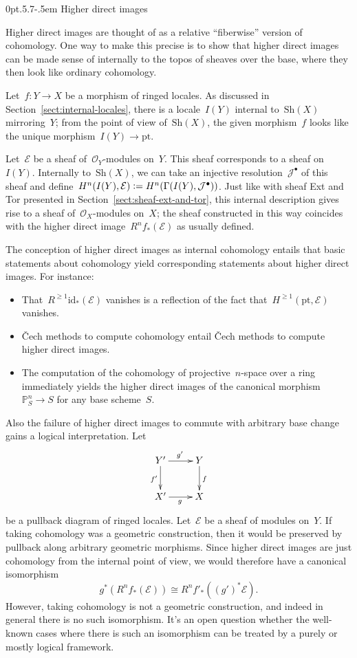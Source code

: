\documentclass[10pt,reqno,a4paper]{amsbook}
\makeatletter
\theoremstyle{definition}
\theoremstyle{plain}
\theoremstyle{remark}
\newcommand{\E}{\mathcal{E}}
\renewcommand{\O}{\mathcal{O}}
\newcommand{\J}{\mathcal{J}}
\newcommand{\PP}{\mathbb{P}}
\newcommand{\id}{\mathrm{id}}
\newcommand{\Sh}{\mathrm{Sh}}
\newcommand{\pt}{\mathrm{pt}}
\newcommand{\?}{\,{:}\,}
\renewcommand{\_}{\mathpunct{.}\,}
\newcommand{\defeq}{\vcentcolon=}
\def\subsection{\@startsection{subsection}{2}%
  {0pt}{.5\linespacing\@plus.7\linespacing}{-.5em}%
  {\normalfont\bfseries}}
\makeatother
\begin{document}
\subsection{Higher direct images}

Higher direct images are thought of as a relative ``fiberwise'' version of
cohomology. One way to make this precise is to show that higher direct images
can be made sense of internally to the topos of sheaves over the base, where
they then look like ordinary cohomology.

Let~$f : Y \to X$ be a morphism of ringed locales. As discussed in
Section~\ref{sect:internal-locales}, there is a locale~$I(Y)$ internal
to~$\Sh(X)$ mirroring~$Y$; from the point of view of~$\Sh(X)$, the given
morphism~$f$ looks like the unique morphism~$I(Y) \to \pt$.

Let~$\E$ be a sheaf of~$\O_Y$-modules on~$Y$. This sheaf corresponds to a sheaf
on~$I(Y)$. Internally to~$\Sh(X)$, we can take an injective
resolution~$\J^\bullet$ of this sheaf and define~$H^n(I(Y), \E) \defeq
H^n(\Gamma(I(Y), \J^\bullet))$. Just like with sheaf Ext and Tor presented in
Section~\ref{sect:sheaf-ext-and-tor}, this internal description gives rise to
a sheaf of~$\O_X$-modules on~$X$; the sheaf constructed in this way coincides
with the higher direct image~$R^n f_*(\E)$ as usually defined.

The conception of higher direct images as internal cohomology entails that
basic statements about cohomology yield corresponding statements about higher
direct images. For instance:

\begin{itemize}
\item That~$R^{\geq1} \id_*(\E)$ vanishes is a reflection of the fact
that~$H^{\geq1}(\pt, \E)$ vanishes.
\item Čech methods to compute cohomology entail Čech methods to compute higher
direct images.
\item The computation of the cohomology of projective~$n$-space over a ring
immediately yields the higher direct images of the canonical morphism~$\PP^n_S
\to S$ for any base scheme~$S$.
\end{itemize}

Also the failure of higher direct images to commute with arbitrary base change
gains a logical interpretation. Let
\[ \xymatrix{
  Y' \ar[r]^{g'}\ar[d]_{f'} & Y \ar[d]^f \\
  X' \ar[r]_g & X
} \]
be a pullback diagram of ringed locales. Let~$\E$ be a sheaf of modules on~$Y$.
If taking cohomology was a geometric construction, then it would be preserved
by pullback along arbitrary geometric morphisms. Since higher direct images are
just cohomology from the internal point of view, we would therefore have a
canonical isomorphism
\[ g^*(R^nf_*(\E)) \cong R^nf'_*((g')^*\E). \]
However, taking cohomology is not a geometric construction, and indeed in
general there is no such isomorphism. It's an open question whether the
well-known cases where there is such an isomorphism can be treated by a purely
or mostly logical framework.
\end{document}
